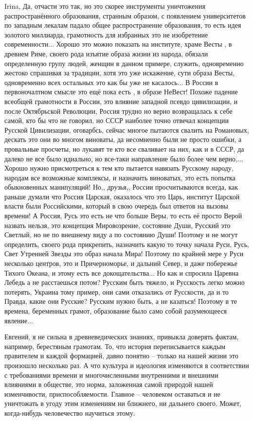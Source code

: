 \begin{itemize}
Irina, Да, отчасти это так, но это скорее инструменты уничтожения
распространённого образования, странным образом, с появлением университетов по
западным лекалам падало общее распространение образования, то есть идея
золотого миллиарда, грамотность для избранных это не изобретение
современности... Хорошо это можно показать на институте, храме Весты , в
древнем Риме, своего рода изъятие образа жизни из народа, обязали определенную
групу людей, женщин в данном примере, служить, одновременно жестоко спрашивая
за традиции, хотя это уже искажение, сути образа Весты, одновременно всех
остальных это как бы уже не касалось... В России в первоночалтном смысле это
ещё пока есть , в образе НеВест! Похоже падение всеобщей грамотности в России,
это влияние западной псевдо цивилизации, и после Октябрьской Революции, Россия
трудно но верно возвращалась к себе самой, кто бы что не говорил, но СССР
наиболее точно отвечал концепции Русской Цивилизации, оговарбсь, сейчас многое
пытаются свалить на Романовых, дескать это они во многом виноваты, да
несомненно были не просто ошибки, а провальные просчеты, но лукавят те кто все
сваливает на них, как и в СССР, да далеко не все было идиально, но все-таки
направление было более чем верно,... Хорошо нужно присмотреться к тем кто
пытается навязать Русскому народу, народам все возможные комплексы, и назначить
виноватых, это есть попытка обыкновенных манипуляций! Но,, друзья,, России
просчитываются всегда, как раньше думали что Россия Царская, оказалось что это
Царь, институт Царской власти были Российскими, который в свою очередь был
ответов на вызовы времени! А Россия, Русь это есть не что больше Веры, то есть
её просто Верой назвать нельзя, это концепция Мировозрение, состояние Души,
Русский это Светлый, но не по внешнему виду а по состоянию Души! Поэтому и не
могут определить, своего рода прикрепить, назначить какую то точку начала Руси,
Русь, Свет Утренней Звезды это образ начала Мира! Поэтому по крайней мере у
Руси несколько центров, это и Причерноморье, и дальний Север, и даже побережье
Тихого Океана, и этому есть все докощательства... Но как и спросила Царевна
Лебедь а не расстаешься потом? Русским быть тяжело, и Русскость легко можно
потерять, Украина тому пример, они сами отказались от Русскости, да и то
Правда, какие они Русские? Русским нужно быть, а не казаться! Поэтому в те
времена, беременных грамот, образование было само собой разумеющееся явление...


Евгений, я не сильна в древневедических знаниях, привыкла доверять фактам,
например, берестяным грамотам. То, что история переписывается каждым правителем
и каждой формацией, давно понятно -- только на нашей жизни это произошло
несколько раз. А что культура и идеология изменяются в соответствии с
требованиями времени и многочисленными внутренними и внешними влияниями в
обществе, это норма, заложенная самой природой нашей изменчивости,
приспособляемости. Главное -- человеком оставаться и не уничтожать в угоду этим
изменениям ни ближнего, ни дальнего своего. Может, когда-нибудь человечество
научиться этому.


\end{itemize}
